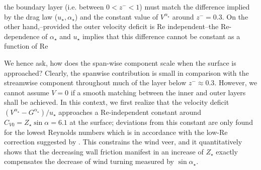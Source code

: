 \documentclass[smallcondensed,final]{svjour3}
\newcommand{\RE}{\mathrm{Re}}
\begin{document}
the boundary layer (i.e. between $0<z^-<1$) must match the difference implied by the drag law ($u_\star, \alpha_\star$)
and the constant value of $V^{\alpha_\star}$ around $z^-=0.3$.
%
On the other hand,--provided the outer velocity deficit is $\RE$ independent--the $\RE$-dependence
of $\alpha_\star$ and $u_\star$ implies that this difference cannot be constant as a function of $\RE$
%
\par 
%
We hence ask, how does the span-wise component scale when the surface is approached?
%
Clearly, the spanwise contribution is small in comparison with the streamwise component
throughout much of the layer below $z^-\approx 0.3$. 
%
However, we cannot assume $V=0$ if a smooth matching between the inner and outer layers shall be achieved. 
%
In this context, we first realize that the velocity deficit $(V^{\alpha_\star}-G^{\alpha_\star})/u_\star$
approaches a $\RE$-independent constant around $C_{V0}=Z_\star \sin\alpha=6.1$ at the surface; deviations from
this constant are only found for the lowest Reynolds numbers which is in accordance with
the low-$\RE$ correction suggested by \cite{spalart:JFM1989}.
%
This constrains the wind veer, and it quantitatively shows that the decreasing wall friction manifest in an
increase of $Z_\star$ exactly compensates the decrease of wind turning measured by $\sin\alpha_\star$. 
\end{document}

